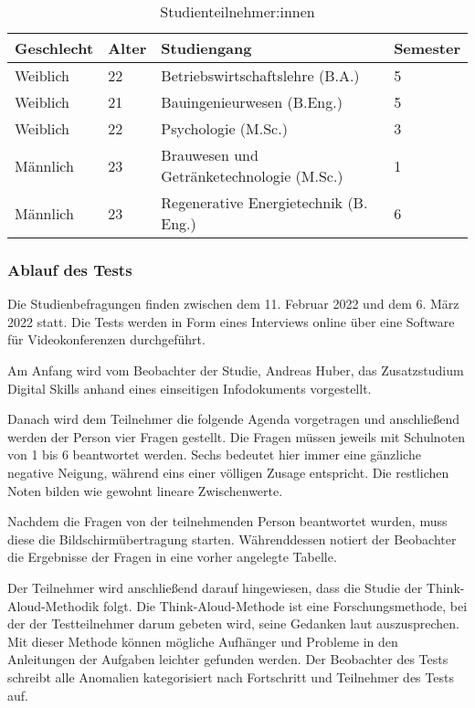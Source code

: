 \begin{table}[H]
\renewcommand*{\arraystretch}{1.6}
\centering
\begin{tabular}{|l|l|l|l|}
\hline
\textbf{Geschlecht} & \textbf{Alter} & \textbf{Studiengang}                      & \textbf{Semester} \\ \hline
Weiblich            & 22             & Betriebswirtschaftslehre (B.A.)           & 5                 \\ \hline
Weiblich            & 21             & Bauingenieurwesen (B.Eng.)                & 5                 \\ \hline
Weiblich            & 22             & Psychologie (M.Sc.)                       & 3                 \\ \hline
Männlich            & 23             & Brauwesen und Getränketechnologie (M.Sc.) & 1                 \\ \hline
Männlich            & 23             & Regenerative Energietechnik (B. Eng.)     & 6                 \\ \hline
\end{tabular}
\caption{Studienteilnehmer:innen}

\label{table:studie-teilnehmende}
\end{table}

\subsubsection{Ablauf des Tests}
Die Studienbefragungen finden zwischen dem 11. Februar 2022 und dem 6. März
2022 statt. Die Tests werden in Form eines Interviews online über eine Software
für Videokonferenzen durchgeführt.

Am Anfang wird vom Beobachter der Studie, Andreas Huber, das Zusatzstudium
Digital Skills anhand eines einseitigen Infodokuments vorgestellt.

Danach wird dem Teilnehmer die folgende Agenda vorgetragen und anschließend
werden der Person vier Fragen gestellt. Die Fragen müssen jeweils mit Schulnoten
von 1 bis 6 beantwortet werden. Sechs bedeutet hier immer eine gänzliche
negative Neigung, während eins einer völligen Zusage entspricht. Die restlichen
Noten bilden wie gewohnt lineare Zwischenwerte.

Nachdem die Fragen von der teilnehmenden Person beantwortet wurden, muss diese
die Bildschirmübertragung starten. Währenddessen notiert der Beobachter die
Ergebnisse der Fragen in eine vorher angelegte Tabelle.

Der Teilnehmer wird anschließend darauf hingewiesen, dass die Studie der
Think-Aloud-Methodik folgt. Die Think-Aloud-Methode ist eine Forschungsmethode,
bei der der Testteilnehmer darum gebeten wird, seine Gedanken laut
auszusprechen. Mit dieser Methode können mögliche Aufhänger und Probleme in den
Anleitungen der Aufgaben leichter gefunden werden. Der Beobachter des Tests
schreibt alle Anomalien kategorisiert nach Fortschritt und Teilnehmer des Tests
auf. \parencite{think-aloud}

